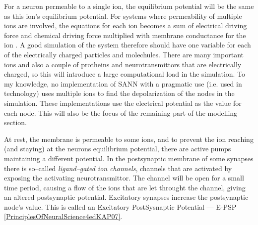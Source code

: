 For a neuron permeable to a single ion, the equilibrium potential will be the same as this ion's equilibrium potential. %
For systems where permeability of multiple ions are involved, the equations for each ion becomes a sum of electrical driving force and chemical driving force multiplied with membrane conductance for the ion
\cite{PrinciplesOfNeuralScience4edKAP07}.
A good simulation of the system therefore should have one variable for each of the electrically charged particles and molechules.
There are many important ions and also a couple of protheins and neurotransmittors that are electrically charged, so this will introduce a large computational load in the simulation.
To my knowledge, no implementation of SANN with a pragmatic use (i.e. used in technology) uses multiple ions to find the depolarization of the nodes in the simulation.
These implementations use the electrical potential as the value for each node. This will also be the focus of the remaining part of the modelling section.

At rest, the membrane is permeable to some ions, and to prevent the ion reaching (and staying) at the neurons equilibrium potential, there are active pumps maintaining a different potential. 
%
In the postsynaptic membrane of some synapses there is so--called \emph{ligand--gated ion channels}, channels that are activated by exposing the activating neurotransmittor\cite{NeuroscienceExploringTheBrain3edKAP5}.
The channel will be open for a small time period, causing a flow of the ions that are let throught the channel, giving an altered postsynaptic potential. 
Excitatory synapses increase the postsynaptic node's value. This is called an Excitatory PostSysnaptic Potential --- E-PSP \ref{PrinciplesOfNeuralScience4edKAP07}.

